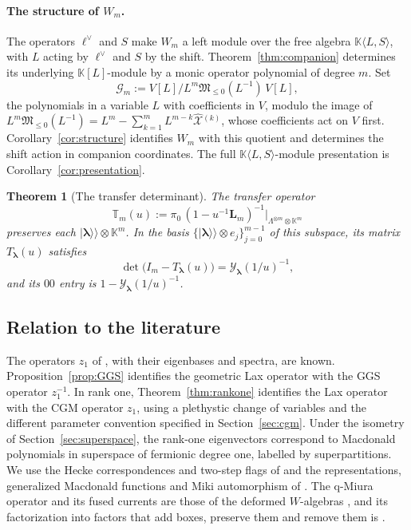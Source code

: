 \documentclass[11pt]{amsart}
\newtheorem{theorem}{Theorem}[section]
\theoremstyle{definition}
\theoremstyle{remark}
\newcommand{\K}{\mathbb K}                       %
\newcommand{\La}{\Lambda}                        %
\newcommand{\bl}{{\boldsymbol{\lambda}}}         %
\newcommand{\CY}{\mathcal Y}
\newcommand{\Yfn}[1]{\CY_{#1}}                   %
\newcommand{\Wsp}[1]{W_{#1}}                     %
\newcommand{\Csec}[1]{\La^{\otimes #1}\otimes\K^{#1}}   %
\newcommand{\auxe}[1]{e_{#1}}                    %
\newcommand{\kket}[1]{\lvert #1\rangle\!\rangle} %
\newcommand{\taut}{\ell}                         %
\newcommand{\dtaut}{\taut^{\vee}}                %
\newcommand{\Shift}{S}                           %
\newcommand{\Llet}{L}                            %
\newcommand{\Gmod}[1]{\mathcal G_{#1}}           %
\newcommand{\zz}[1]{z_{#1}}
\newcommand{\zone}{\zz{1}}
\newcommand{\LL}{\mathbf L}
\newcommand{\Lax}[1]{\LL_{#1}}                   %
\newcommand{\piz}{\pi_0}                         %
\newcommand{\TT}{\mathbb T}
\newcommand{\Transfer}[2]{\TT_{#1}(#2)}          %
\newcommand{\TransferMat}[2]{T_{#1}(#2)}         %
\newcommand{\Xhat}[1]{\widehat{\mathcal X}{}^{(#1)}}   %
\newcommand{\Miuraop}{\mathfrak M}               %
\newcommand{\Miuraproj}{\Miuraop_{\leq0}}         %
\begin{document}
\paragraph{The structure of \(\Wsp{m}\).}
The operators \(\dtaut\) and \(\Shift\) make \(\Wsp{m}\) a left module over the free algebra
\(\K\langle\Llet,\Shift\rangle\), with \(\Llet\) acting by \(\dtaut\) and \(\Shift\) by the shift.
Theorem~\ref{thm:companion} determines its underlying \(\K[\Llet]\)-module by a monic operator
polynomial of degree \(m\). Set
\begin{equation}\label{eq:modulequotient}
 \Gmod{m}:=V[\Llet]\big/\Llet^m\Miuraproj(\Llet^{-1})\,V[\Llet],
\end{equation}
the polynomials in a variable \(\Llet\) with coefficients in \(V\), modulo the image of
\(\Llet^m\Miuraproj(\Llet^{-1})=\Llet^m-\sum_{k=1}^m\Llet^{m-k}\Xhat{k}\), whose coefficients act on
\(V\) first. Corollary~\ref{cor:structure} identifies \(\Wsp{m}\) with this
quotient and determines the shift action in companion coordinates.
The full \(\K\langle\Llet,\Shift\rangle\)-module presentation is
Corollary~\ref{cor:presentation}.

\begin{theorem}[The transfer determinant]\label{thm:transfer}
The transfer operator
\[
 \Transfer{m}{u}:=\piz\,(1-u^{-1}\Lax{m})^{-1}\big|_{\Csec{m}}
\]
preserves each \(\kket{\bl}\otimes\K^m\). In the basis
\(\{\kket{\bl}\otimes\auxe{j}\}_{j=0}^{m-1}\) of this subspace, its matrix
\(\TransferMat{\bl}{u}\) satisfies
\[
 \boxed{\;\det\bigl(I_m-\TransferMat{\bl}{u}\bigr)=\Yfn{\bl}(1/u)^{-1},\;}
\]
and its \(00\) entry is \(1-\Yfn{\bl}(1/u)^{-1}\).
\end{theorem}

\subsection{Relation to the literature}
The operators \(\zone\) of \cite{CGM,GGS}, with their eigenbases and spectra, are known.
Proposition~\ref{prop:GGS} identifies the geometric Lax operator with the GGS operator
\(\zone^{-1}\). In rank one, Theorem~\ref{thm:rankone} identifies the Lax operator
with the CGM operator \(\zone\), using a plethystic change of variables and the
different parameter convention specified in Section~\ref{sec:cgm}.
Under the isometry of Section~\ref{sec:superspace}, the rank-one eigenvectors
correspond to Macdonald polynomials in superspace of fermionic degree one,
labelled by superpartitions. We use the
Hecke correspondences and two-step flags of \cite{N1,N2} and the representations, generalized Macdonald
functions and Miki automorphism of \cite{BCS}. The q-Miura operator and its fused currents are those of
the deformed \(W\)-algebras \cite{FR,FF,AKOS,AFHKSY,FHSSY}, and its factorization into factors that add
boxes, preserve them and remove them is \cite[Theorem~1.2]{N3}.
\end{document}
